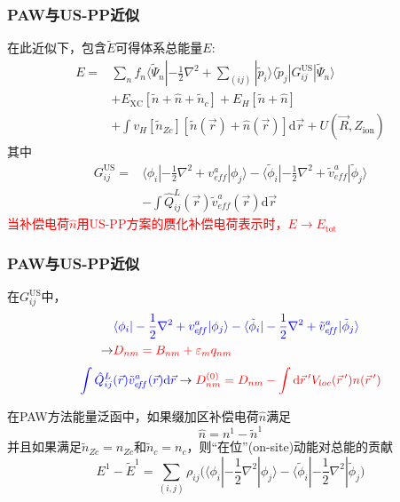 \documentclass[cjk,slidestop,compress,mathserif,blue]{beamer}
\begin{document}
\frame
{
	\frametitle{\textrm{PAW}与\textrm{US-PP}近似}
	在此近似下，包含$\tilde E$可得体系总能量$E$:
	\begin{displaymath}
		\begin{aligned}
			E=&\sum_nf_n\langle\tilde\Psi_n|-\frac12\nabla^2+\sum_{(ij)}|\tilde p_i\rangle\langle\tilde p_j|G_{ij}^{\mathrm{US}}|\tilde\Psi_n\rangle\\
			&+E_{\mathrm{XC}}[\tilde n+\hat n+\tilde n_c]+E_H[\tilde n+\hat n]\\
			&+\int v_H[\tilde n_{Zc}][\tilde n(\vec r)+\hat n(\vec r)]\mathrm{d}\vec r+U(\vec R,Z_{\mathrm{ion}})
		\end{aligned}
	\end{displaymath}
	其中
	\begin{displaymath}
		\begin{aligned}
			G_{ij}^{\mathrm{US}}=&\langle\phi_i|-\frac12\nabla^2+v_{e\!f\!f}^a|\phi_j\rangle-\langle\tilde\phi_i|-\frac12\nabla^2+\tilde v_{e\!f\!f}^a|\tilde\phi_j\rangle\\
			&-\int\hat Q_{ij}^L(\vec r)\tilde v_{e\!f\!f}^a(\vec r)\mathrm{d}\vec r
		\end{aligned}
	\end{displaymath}
	\textcolor{red}{当补偿电荷$\hat n$用\textrm{US-PP}方案的赝化补偿电荷表示时，$E\rightarrow E_{\mathrm{tot}}$}
}

\frame
{
	\frametitle{\textrm{PAW}与\textrm{US-PP}近似}
	在$G_{ij}^{\mathrm{US}}$中，
	\begin{displaymath}
		\begin{aligned}
			&\textcolor{blue}{\langle\phi_i|-\frac12\nabla^2+v_{e\!f\!f}^a|\phi_j\rangle-\langle\tilde\phi_i|-\frac12\nabla^2+\tilde v_{e\!f\!f}^a|\tilde\phi_j\rangle}\\
			\rightarrow&\textcolor{red}{D_{nm}=B_{nm}+\varepsilon_mq_{nm}}
		\end{aligned}
	\end{displaymath}
	\begin{displaymath}
		\textcolor{blue}{\int\hat Q_{ij}^L(\vec r)\tilde v_{e\!f\!f}^a(\vec r)\mathrm{d}\vec r}\rightarrow\textcolor{red}{D_{nm}^{(0)}=D_{nm}-\int\mathrm{d}\vec r\,^{\prime}V_{loc}(\vec r\,^{\prime})n(\vec r\,^{\prime})}
	\end{displaymath}

	在\textrm{PAW}方法能量泛函中，如果缀加区补偿电荷$\hat n$满足$$\hat n=n^1-\tilde n^1$$
	并且如果满足$\tilde n_{Zc}=n_{Zc}$和$\tilde n_c=n_c$，则“在位”(\textrm{on-site})动能对总能的贡献
	\begin{displaymath}
		E^1-\tilde E^1=\sum_{(i,j)}\rho_{ij}\big(\langle\phi_i|-\frac12\nabla^2|\phi_j\rangle-\langle\tilde\phi_i|-\frac12\nabla^2|\tilde\phi_j\big)
	\end{displaymath}
}
\end{document}
